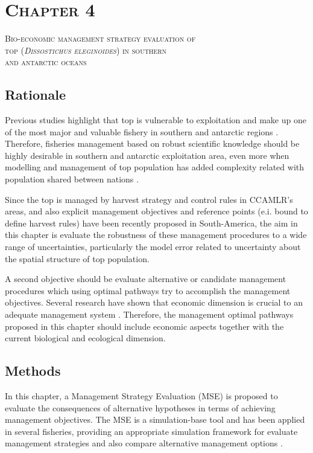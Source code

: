 \section*{\scshape Chapter 4}
{\Large \scshape Bio-economic management strategy evaluation of \\
 \acl{top} (\emph{Dissostichus eleginoides}) in  southern \\ and antarctic oceans} %
\label{sec:chapter4}

\subsection*{Rationale}

Previous studies highlight that \acl{top} is vulnerable to exploitation and make up one of the most major and valuable fishery in southern and antarctic regions \citep{Constable2000778,Norse2012}. Therefore, fisheries management based on robust scientific knowledge should be highly desirable in southern and antarctic exploitation area, even more when modelling and management of \acl{top} population has added complexity related with population shared between nations \citep{Candy2011b}. 

Since the \acl{top} is managed by harvest strategy and control rules in CCAMLR's areas, and also explicit management objectives and reference points (e.i. bound to define harvest rules) have been recently proposed in South-America, the aim in this chapter is evaluate the robustness of these management procedures to a wide range of uncertainties, particularly the model error related to uncertainty about the spatial structure of \acl{top} population. 

A second objective should be evaluate alternative or candidate management procedures which using optimal pathways try to accomplish the management objectives. Several research have shown that economic dimension is crucial to an adequate management system \citep{Dichmont2010,calebthesis,Hilborn2012,eltit,Hoshino2014,Punt2013116,Emery2014}. Therefore, the management optimal pathways proposed in this chapter should include economic aspects together with the current biological and ecological dimension.


\subsection*{Methods}

In this chapter, a Management Strategy Evaluation (MSE) is proposed  to evaluate the consequences of alternative hypotheses in terms of achieving management objectives. The MSE is a simulation-base tool and has been applied in several fisheries, providing an appropriate simulation framework for evaluate management strategies and also compare alternative management options \citep{Aranda,Milner-Gulland2011,Hilborn2012}. 

